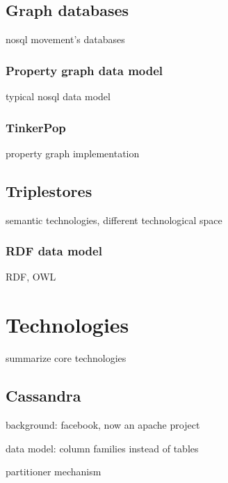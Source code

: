 
\subsection{Graph databases}

nosql movement's databases

\subsubsection{Property graph data model}

typical nosql data model

\subsubsection{TinkerPop}

property graph implementation

\subsection{Triplestores}

semantic technologies, different technological space

\subsubsection{RDF data model}

RDF, OWL

\section{Technologies}

summarize core technologies

\subsection{Cassandra}

background: facebook, now an apache project

data model: column families instead of tables


partitioner mechanism



